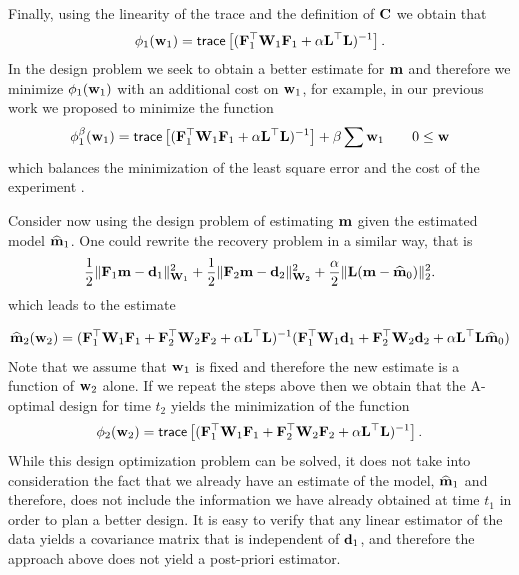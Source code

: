 \documentclass[11pt]{article}
\newcommand{\bfC}	{{\bf{C}}}
\newcommand{\bfF}	{{\bf{F}}}
\newcommand{\bfL}	{{\bf{L}}}
\newcommand{\bfW}	{{\bf{W}}}
\newcommand{\bfd}	{{\bf{d}}}
\newcommand{\bfm}	{{\bf{m}}}
\newcommand{\bfw}	{{\bf{w}}}
\newcommand{\hf}        {{\frac 12}}
\newcommand{\LtL}       { \bfL^{\top}\bfL}
\renewcommand{\hf}		 {\frac12}
\newcommand{\bfmhat}    {{\widehat{\bfm}}}
\begin{document}
Finally, using the linearity of the trace and the definition of $\bfC$ we obtain that
\begin{eqnarray}
\label{design1}
\phi_{1}(\bfw_1 ) =  {\sf trace} \left[   (\bfF_{1}^{\top}\bfW_{1}\bfF_{1}   + 
 {\alpha} \LtL)^{-1} \right]. 
\end{eqnarray}
In the design problem we seek to obtain a better estimate for $\bfm$ and therefore
we minimize $\phi_{1}(\bfw_{1})$ with an additional cost on $\bfw_{1}$, for example, in our
previous work we proposed to minimize the function
\begin{eqnarray}
\label{designp1}
\phi_{1}^{\beta}(\bfw_1 ) =  {\sf trace} \left[   (\bfF_{1}^{\top}\bfW_{1}\bfF_{1}   + 
 {\alpha} \LtL)^{-1} \right]  + \beta \sum \bfw_{1} \quad \quad 0 \le \bfw 
\end{eqnarray}
which balances the minimization of the least square error and the cost of the experiment \cite{Haber2008}.


\bigskip

Consider now using the design problem of estimating $\bfm$ given the estimated model $\widehat \bfm_{1}$.
One could rewrite the recovery problem in a similar way, that is
\begin{eqnarray}
\label{mest2}
\hf \| \bfF_{1} \bfm - \bfd_{1}\|^{2}_{\bfW_{1}} + \hf \| \bfF_{2} \bfm - \bfd_{2}\|^{2}_{\bfW_{2}}  + {\frac {\alpha} 2}
\|\bfL (\bfm -\bfmhat_{0}) \|^{2}_2. 
\end{eqnarray}
which leads to the estimate

\begin{eqnarray}
\label{mest2}
\bfmhat_{2}(\bfw_{2}) = (\bfF_{1}^{\top} \bfW_{1}\bfF_{1} +
\bfF_{2}^{\top} \bfW_{2}\bfF_{2} + \alpha \LtL)^{-1} (\bfF_{1}^{\top} \bfW_{1} \bfd_{1} +\bfF_{2}^{\top} \bfW_{2} \bfd_{2}
+ \alpha \LtL \bfmhat_{0})
\end{eqnarray}
Note that we assume that $\bfw_{1}$ is fixed and therefore the new estimate is a function of $\bfw_{2}$ alone.
If we repeat the steps above then we obtain that the A-optimal design for time $t_{2}$ yields the minimization of
the function
\begin{eqnarray}
\label{design2na}
\phi_{2}(\bfw_{2} ) =  {\sf trace} \left[   (\bfF_{1}^{\top}\bfW_{1}\bfF_{1}   + \bfF_{2}^{\top}\bfW_{2}\bfF_{2} +
\alpha \LtL)^{-1} \right]. 
\end{eqnarray}
While this design optimization problem can be solved, it does not take into consideration the fact that 
we already  have an estimate of the model, $\bfmhat_{1}$ and therefore, does not include the 
information we have already obtained at time $t_{1}$ in order to plan a better design.
It is easy to verify that any linear estimator of the data yields a covariance matrix that is independent of $\bfd_{1}$,
and therefore the approach above does not yield a post-priori estimator.
\end{document}
